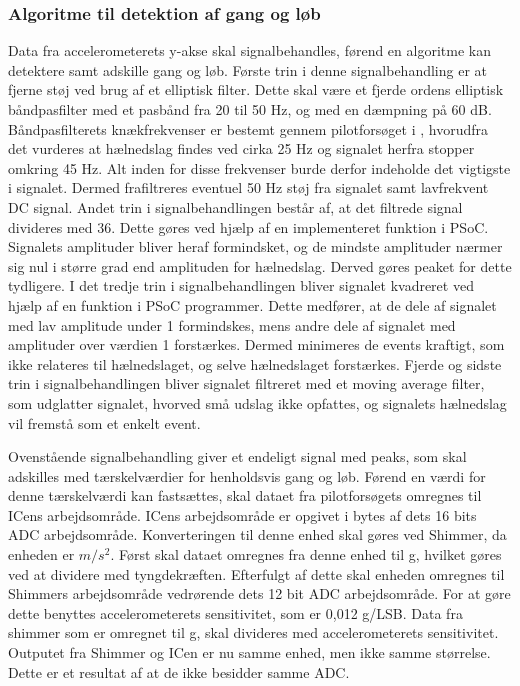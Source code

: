 \subsubsection{Algoritme til detektion af gang og løb} \label{design_algo_g_l}
Data fra accelerometerets y-akse skal signalbehandles, førend en algoritme kan detektere samt adskille gang og løb. Første trin i denne signalbehandling er at fjerne støj ved brug af et elliptisk filter. Dette skal være et fjerde ordens elliptisk båndpasfilter med et pasbånd fra 20 til 50 Hz, og med en dæmpning på 60 dB. Båndpasfilterets knækfrekvenser er bestemt gennem pilotforsøget i , hvorudfra det vurderes at hælnedslag findes ved cirka 25 Hz og signalet herfra stopper omkring 45 Hz. Alt inden for disse frekvenser burde derfor indeholde det vigtigste i signalet. Dermed frafiltreres eventuel 50 Hz støj fra signalet samt lavfrekvent DC signal. %
Andet trin i signalbehandlingen består af, at det filtrede signal divideres med 36. Dette gøres ved hjælp af en implementeret funktion i PSoC. Signalets amplituder bliver heraf formindsket, og de mindste amplituder nærmer sig nul i større grad end amplituden for hælnedslag. Derved gøres peaket for dette tydligere. I det tredje trin i signalbehandlingen bliver signalet kvadreret ved hjælp af en funktion i PSoC programmer. Dette medfører, at de dele af signalet med lav amplitude under 1 formindskes, mens andre dele af signalet med amplituder over værdien 1 forstærkes. Dermed minimeres de events kraftigt, som ikke relateres til hælnedslaget, og selve hælnedslaget forstærkes. Fjerde og sidste trin i signalbehandlingen bliver signalet filtreret med et moving average filter, som udglatter signalet, hvorved små udslag ikke opfattes, og signalets hælnedslag vil fremstå som et enkelt event.

Ovenstående signalbehandling giver et endeligt signal med peaks, som skal adskilles med tærskelværdier for henholdsvis gang og løb. Førend en værdi for denne tærskelværdi kan fastsættes, skal dataet fra pilotforsøgets omregnes til ICens arbejdsområde. ICens arbejdsområde er opgivet i bytes af dets 16 bits ADC arbejdsområde. Konverteringen til denne enhed skal gøres ved Shimmer, da enheden er $m/s^{2}$. Først skal dataet omregnes fra denne enhed til g, hvilket gøres ved at dividere med tyngdekræften. Efterfulgt af dette skal enheden omregnes til Shimmers arbejdsområde vedrørende dets 12 bit ADC arbejdsområde. For at gøre dette benyttes accelerometerets sensitivitet, som er 0,012 g/LSB. Data fra shimmer som er omregnet til g, skal divideres med accelerometerets sensitivitet. Outputet fra Shimmer og ICen er nu samme enhed, men ikke samme størrelse. Dette er et resultat af at de ikke besidder samme ADC.
 
